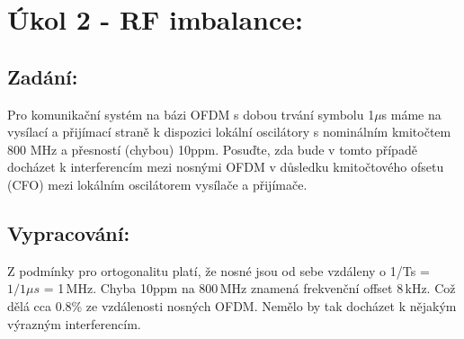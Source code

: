 \documentclass[10pt, a4paper]{article}%
\begin{document}
            
    
    \section*{\Large Úkol 2 - RF imbalance:}
    \subsection*{Zadání:}
    Pro komunikační systém na bázi OFDM s dobou trvání symbolu 1$\mu$s máme na vysílací a
    přijímací straně k dispozici lokální oscilátory s nominálním kmitočtem 800 MHz a přesností (chybou)
    10ppm.  Posuďte, zda bude v tomto případě docházet k interferencím mezi nosnými OFDM v
    důsledku kmitočtového ofsetu (CFO) mezi lokálním oscilátorem vysílače a přijímače. 

    \subsection*{Vypracování:}
    Z podmínky pro ortogonalitu platí, že nosné jsou od sebe vzdáleny o 1/Ts = $1/1\mu s$ = 1\,MHz.
    Chyba 10ppm na 800\,MHz znamená frekvenční offset 8\,kHz. Což dělá cca 0.8\% ze vzdálenosti nosných OFDM.
    Nemělo by tak docházet k nějakým výrazným interferencím.
\end{document}
